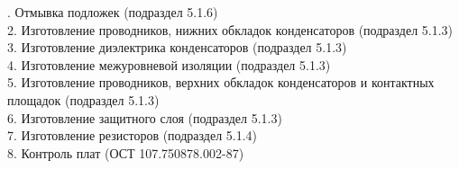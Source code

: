 \documentclass{bmstu}
\begin{document}
	. Отмывка подложек (подраздел 5.1.6) \\
	2. Изготовление проводников, нижних обкладок конденсаторов (подраздел 5.1.3) \\
	3. Изготовление диэлектрика конденсаторов (подраздел 5.1.3) \\
	4. Изготовление межуровневой изоляции (подраздел 5.1.3) \\
	5. Изготовление проводников, верхних обкладок конденсаторов и контактных площадок (подраздел 5.1.3) \\
	6. Изготовление защитного слоя (подраздел 5.1.3) \\
	7. Изготовление резисторов (подраздел 5.1.4) \\
	8. Контроль плат (ОСТ 107.750878.002-87) \\
\end{document}

